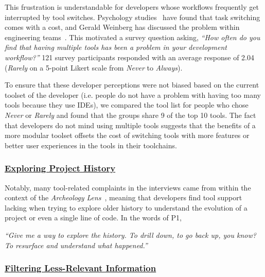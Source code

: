This frustration is understandable for developers whose workflows frequently get interrupted by tool switches. Psychology studies~\cite{Meiran2000}\cite{gopher2000switching} have found that task switching comes with a cost, and Gerald Weinberg has discussed the problem within engineering teams~\cite{Weinberg1992}. 
This motivated a survey question asking, \textit{``How often do you find that having multiple tools has been a problem in your development workflow?''} 121 survey participants responded with an average response of 2.04 (\textit{Rarely} on a 5-point Likert scale from \textit{Never} to \textit{Always}). 

To ensure that these developer perceptions were not biased based on the current toolset of the developer (i.e. people do not have a problem with having too many tools because they use IDEs), we compared the tool list for people who chose \textit{Never} or \textit{Rarely} and found that the groups share 9 of the top 10 tools. The fact that developers do not mind using multiple tools suggests that the benefits of a more modular toolset offsets the cost of switching tools with more features or better user experiences in the tools in their toolchains. 

\subsubsection{\underline{Exploring Project History}}
Notably, many tool-related complaints in the interviews came from within the context of the \textit{Archeology Lens}~\cite{mihai_lenses}, meaning that developers find tool support lacking when trying to explore older history to understand the evolution of a project or even a single line of code. In the words of P1, 

\begin{displayquote}
\textit{``Give me a way to explore the history. To drill down, to go back up, you know? To resurface and understand what happened.''}
\end{displayquote}


\subsubsection{\underline{Filtering Less-Relevant Information}}

